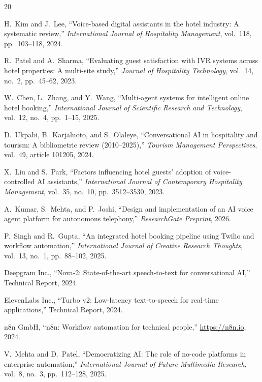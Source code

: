 \documentclass[conference]{IEEEtran}
\begin{document}
\begin{thebibliography}{20}

H.~Kim and J.~Lee, ``Voice-based digital assistants in the hotel industry: A systematic review,'' \textit{International Journal of Hospitality Management}, vol.~118, pp.~103--118, 2024.

R.~Patel and A.~Sharma, ``Evaluating guest satisfaction with IVR systems across hotel properties: A multi-site study,'' \textit{Journal of Hospitality Technology}, vol.~14, no.~2, pp.~45--62, 2023.

W.~Chen, L.~Zhang, and Y.~Wang, ``Multi-agent systems for intelligent online hotel booking,'' \textit{International Journal of Scientific Research and Technology}, vol.~12, no.~4, pp.~1--15, 2025.

D.~Ukpabi, B.~Karjaluoto, and S.~Olaleye, ``Conversational AI in hospitality and tourism: A bibliometric review (2010--2025),'' \textit{Tourism Management Perspectives}, vol.~49, article 101205, 2024.

X.~Liu and S.~Park, ``Factors influencing hotel guests' adoption of voice-controlled AI assistants,'' \textit{International Journal of Contemporary Hospitality Management}, vol.~35, no.~10, pp.~3512--3530, 2023.

A.~Kumar, S.~Mehta, and P.~Joshi, ``Design and implementation of an AI voice agent platform for autonomous telephony,'' \textit{ResearchGate Preprint}, 2026.

P.~Singh and R.~Gupta, ``An integrated hotel booking pipeline using Twilio and workflow automation,'' \textit{International Journal of Creative Research Thoughts}, vol.~13, no.~1, pp.~88--102, 2025.

Deepgram Inc., ``Nova-2: State-of-the-art speech-to-text for conversational AI,'' Technical Report, 2024.

ElevenLabs Inc., ``Turbo v2: Low-latency text-to-speech for real-time applications,'' Technical Report, 2024.

n8n GmbH, ``n8n: Workflow automation for technical people,'' \url{https://n8n.io}, 2024.

V.~Mehta and D.~Patel, ``Democratizing AI: The role of no-code platforms in enterprise automation,'' \textit{International Journal of Future Multimedia Research}, vol.~8, no.~3, pp.~112--128, 2025.


\end{thebibliography}
\end{document}
